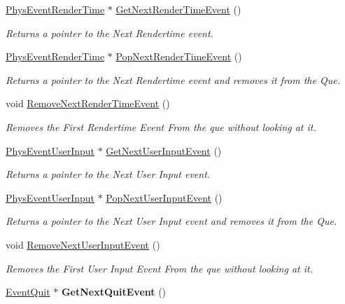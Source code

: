 \begin{DoxyCompactItemize}
\item 
\hyperlink{classPhysEventRenderTime}{PhysEventRenderTime} $\ast$ \hyperlink{classPhysEventManager_a1f2d0506ce816176913e5bdfaa9fd724}{GetNextRenderTimeEvent} ()
\begin{DoxyCompactList}\small\item\em Returns a pointer to the Next Rendertime event. \item\end{DoxyCompactList}\item 
\hyperlink{classPhysEventRenderTime}{PhysEventRenderTime} $\ast$ \hyperlink{classPhysEventManager_ad627925363fdbcff98e0faef204e81e2}{PopNextRenderTimeEvent} ()
\begin{DoxyCompactList}\small\item\em Returns a pointer to the Next Rendertime event and removes it from the Que. \item\end{DoxyCompactList}\item 
void \hyperlink{classPhysEventManager_a56acc075e743921e27284c023b3298ce}{RemoveNextRenderTimeEvent} ()
\begin{DoxyCompactList}\small\item\em Removes the First Rendertime Event From the que without looking at it. \item\end{DoxyCompactList}\item 
\hyperlink{classPhysEventUserInput}{PhysEventUserInput} $\ast$ \hyperlink{classPhysEventManager_a4874a9b1138d2351bf28e527a66c02b8}{GetNextUserInputEvent} ()
\begin{DoxyCompactList}\small\item\em Returns a pointer to the Next User Input event. \item\end{DoxyCompactList}\item 
\hyperlink{classPhysEventUserInput}{PhysEventUserInput} $\ast$ \hyperlink{classPhysEventManager_ad6612a6e1c728941e2c467e7f136ca51}{PopNextUserInputEvent} ()
\begin{DoxyCompactList}\small\item\em Returns a pointer to the Next User Input event and removes it from the Que. \item\end{DoxyCompactList}\item 
void \hyperlink{classPhysEventManager_a9c6f5296c9961fa469ebe06d7599283a}{RemoveNextUserInputEvent} ()
\begin{DoxyCompactList}\small\item\em Removes the First User Input Event From the que without looking at it. \item\end{DoxyCompactList}\item 
\hypertarget{classPhysEventManager_a61aa2ee266536d45fec2be0487f77940}{
\hyperlink{classphys_1_1EventQuit}{EventQuit} $\ast$ {\bfseries GetNextQuitEvent} ()}
\label{d5/dd7/classPhysEventManager_a61aa2ee266536d45fec2be0487f77940}


\end{DoxyCompactItemize}

